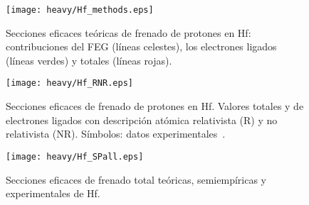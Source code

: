 \begin{figure}
\centering
\vspace{-0.8cm}
\texttt{[image: heavy/Hf\_methods.eps]}
\vspace{-0.2cm}
\caption[Secciones eficaces teóricas de frenado de protones en Hf.]
{Secciones eficaces teóricas de frenado de protones en Hf: 
contribuciones del FEG (líneas celestes), los electrones ligados 
(líneas verdes) y totales (líneas rojas).} 
\label{fig:Hf_methods}

\vspace{0.3cm}
\texttt{[image: heavy/Hf\_RNR.eps]}
\vspace{-0.2cm}
\caption[Secciones eficaces relativistas y no relativistas de Hf.]
{Secciones eficaces de frenado de protones en Hf. Valores totales y 
de electrones ligados con descripción atómica relativista (R) y no 
relativista (NR). 
Símbolos: datos experimentales~\cite{Montanari:20,Sirotinin}.}
\label{fig:Hf_SP}
\end{figure}


\begin{figure}[t]
\centering
\texttt{[image: heavy/Hf\_SPall.eps]}
\caption[Secciones eficaces teóricas, semiempíricas y experimentales de 
Hf.]{Secciones eficaces de frenado total teóricas, semiempíricas y
experimentales de Hf.}
\label{fig:Hf_SPall}
\end{figure}

